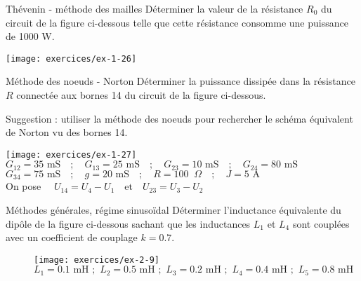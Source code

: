 \begin{exercise}{Thévenin - méthode des mailles}\label{ex:mg-9}
Déterminer la valeur de la résistance $R_0$ du circuit de la
 figure ci-dessous telle que cette résistance consomme une puissance de
1000 W.
\begin{center}
	\texttt{[image: exercices/ex-1-26]}
\end{center}
\end{exercise}

\begin{exercise}{Méthode des noeuds - Norton}\label{ex:mg-10}
Déterminer la puissance dissipée dans la résistance $R$
connectée aux bornes 14 du circuit de la  figure ci-dessous.

Suggestion : utiliser la méthode des noeuds pour rechercher le schéma
équivalent de Norton vu des bornes 14. 
\begin{center}
\texttt{[image: exercices/ex-1-27]}
$G_{12}=35 \mbox{~mS}\quad ; \quad G_{13}=25 \mbox{~mS}\quad ; \quad 
G_{23}=10 \mbox{~mS}\quad ; \quad G_{24}=80 \mbox{~mS}$\\
$G_{34}=75 \mbox{~mS}\quad ; \quad g=20 \mbox{~mS}\quad ; \quad
R=100 \;\; \Omega \quad ; \quad J=5 \mbox{~A}$\\
On pose $\quad U_{14}=U_4-U_1 \quad \mbox{et}\quad U_{23}=U_3-U_2$
\end{center}
\end{exercise}


\begin{exercise}{Méthodes générales, régime sinusoïdal}\label{ex:RSE-9}
	Déterminer l'inductance équivalente du dipôle de la
	figure ci-dessous sachant que les inductances $L_1$ et $L_4$ sont
	couplées avec un coefficient de couplage $k=0.7$.
	\begin{figure}[h]
		\begin{center}
			\texttt{[image: exercices/ex-2-9]}\\
			$L_1=0.1 \mbox{~mH} \,\, ; \,\, L_2=0.5 \mbox{~mH} \,\, ; \,\,
			L_3=0.2 \mbox{~mH} \,\, ; \,\, L_4=0.4 \mbox{~mH} \,\, ; \,\,
			L_5=0.8 \mbox{~mH}$\\
			\caption{}\label{ex2-9}
		\end{center}
	\end{figure}
\end{exercise}

